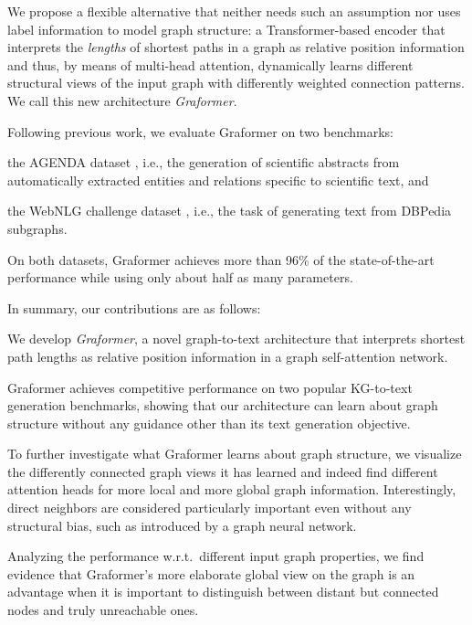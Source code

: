 \documentclass[11pt]{article}
\begin{document}
We propose a flexible alternative
that neither needs such an assumption nor uses label information to model graph structure:
a Transformer-based encoder
that interprets the \textit{lengths} of shortest paths in a graph as relative position information
and thus, by means of multi-head attention,
dynamically learns different structural views of the input graph with differently weighted connection patterns.
We call this new architecture \emph{Graformer}.

Following previous work,
we evaluate Graformer on two benchmarks:
\begin{enumerate*}[label={(\roman{*})}]
	\item the AGENDA dataset \citep{koncel-kedziorski-etal-2019-text}, i.e.,
	the generation of scientific abstracts
	from
	automatically extracted
	entities and relations specific to scientific text,
	and
	\item the WebNLG challenge dataset \citep{gardent-etal-2017-webnlg},
	i.e., the task of generating text from DBPedia subgraphs.
\end{enumerate*}
On both datasets,
Graformer achieves more than 96\%{} of the state-of-the-art performance
while using only about half as many parameters.

In summary, our contributions are as follows:
\begin{enumerate*}[label=(\arabic*)]
	\item We develop \emph{Graformer}, a novel graph-to-text architecture that interprets shortest path lengths as relative position information in a graph self-attention network.
	\item Graformer achieves competitive performance on two popular KG-to-text generation benchmarks, showing that our architecture can learn about graph structure without any guidance other than its text generation objective.
	\item To further investigate what Graformer learns about graph structure, we visualize the differently connected graph views it has learned and indeed find different attention heads for more local and more global graph information. Interestingly, direct neighbors are considered particularly important even without any structural bias, such as introduced by a graph neural network.
	\item Analyzing the performance w.r.t.\ different input graph properties,
	we find evidence that Graformer's more elaborate global view on the graph is an advantage
	when it is important to distinguish between distant but connected nodes and truly unreachable ones.
\end{enumerate*}
\end{document}
